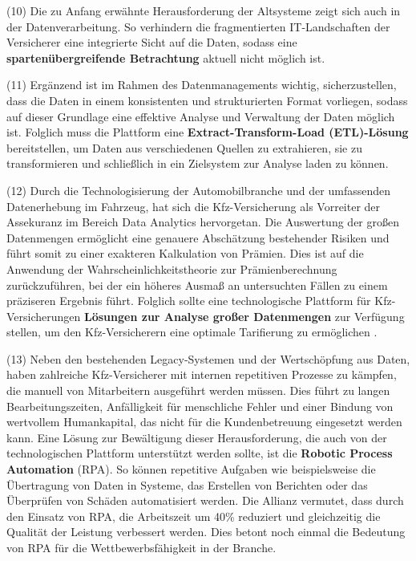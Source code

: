 (10) Die zu Anfang erwähnte Herausforderung der Altsysteme zeigt sich auch in der Datenverarbeitung. So verhindern die fragmentierten IT-Landschaften der Versicherer eine integrierte Sicht auf die Daten, sodass eine \textbf{spartenübergreifende Betrachtung} aktuell nicht möglich ist. \autocite[Vgl.][S. 11]{GUNTER2020}

(11) Ergänzend ist im Rahmen des Datenmanagements wichtig, sicherzustellen, dass die Daten in einem konsistenten und strukturierten Format vorliegen, sodass auf dieser Grundlage eine effektive Analyse und Verwaltung der Daten möglich ist. Folglich muss die Plattform eine \textbf{Extract-Transform-Load (ETL)-Lösung} bereitstellen, um Daten aus verschiedenen Quellen zu extrahieren, sie zu transformieren und schließlich in ein Zielsystem zur Analyse laden zu können. \autocite[Vgl.][]{WEINGARTNER2023}

(12) Durch die Technologisierung der Automobilbranche und der umfassenden Datenerhebung im Fahrzeug, hat sich die Kfz-Versicherung als Vorreiter der Assekuranz im Bereich Data Analytics hervorgetan. \autocite[Vgl.][S. 187]{GATZERT2023} Die Auswertung der großen Datenmengen ermöglicht eine genauere Abschätzung bestehender Risiken und führt somit zu einer exakteren Kalkulation von Prämien. Dies ist auf die Anwendung der Wahrscheinlichkeitstheorie zur Prämienberechnung zurückzuführen, bei der ein höheres Ausmaß an untersuchten Fällen zu einem präziseren Ergebnis führt. Folglich sollte eine technologische Plattform für Kfz-Versicherungen \textbf{Lösungen zur Analyse großer Datenmengen} zur Verfügung stellen, um den Kfz-Versicherern eine optimale Tarifierung zu ermöglichen \autocite[Vgl.][S. 146]{MANGEI2019}. 

(13) Neben den bestehenden Legacy-Systemen und der Wertschöpfung aus Daten, haben zahlreiche Kfz-Versicherer mit internen repetitiven Prozesse zu kämpfen, die manuell von Mitarbeitern ausgeführt werden müssen. Dies führt zu langen Bearbeitungszeiten, Anfälligkeit für menschliche Fehler und einer Bindung von wertvollem Humankapital, das nicht für die Kundenbetreuung eingesetzt werden kann. Eine Lösung zur Bewältigung dieser Herausforderung, die auch von der technologischen Plattform unterstützt werden sollte, ist die \textbf{Robotic Process Automation} (RPA). So können repetitive Aufgaben wie beispielsweise die Übertragung von Daten in Systeme, das Erstellen von Berichten oder das Überprüfen von Schäden automatisiert werden. \autocite[Vgl.][S. 296-298]{REICH2019}  Die Allianz vermutet, dass durch den Einsatz von RPA, die Arbeitszeit um 40\% reduziert und gleichzeitig die Qualität der Leistung verbessert werden. Dies betont noch einmal die Bedeutung von RPA für die Wettbewerbsfähigkeit in der Branche. \autocite[Vgl.][S. 296-298]{REICH2019}

